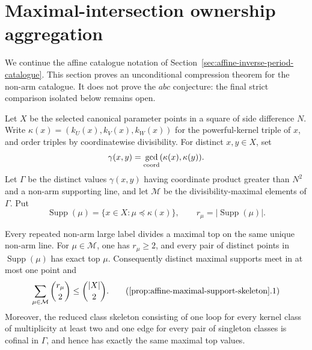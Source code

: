 \section{Maximal-intersection ownership aggregation}
\label{sec:affine-ownership-maximal-intersection}

We continue the affine catalogue notation of
Section~\ref{sec:affine-inverse-period-catalogue}.  This section proves an
unconditional compression theorem for the non-arm catalogue.  It does not
prove the \(abc\) conjecture: the final strict comparison isolated below
remains open.

Let \(X\) be the selected canonical parameter points in a square of side
difference \(N\).  Write \(\kappa(x)=(k_U(x),k_V(x),k_W(x))\) for the
powerful-kernel triple of \(x\), and order triples by coordinatewise
divisibility.  For distinct \(x,y\in X\), set
\[
 \gamma(x,y)=\gcd_{\rm coord}(\kappa(x),\kappa(y)).
\]
Let \(\Gamma\) be the distinct values \(\gamma(x,y)\) having coordinate
product greater than \(N^2\) and a non-arm supporting line, and let
\(\mathcal M\) be the divisibility-maximal elements of \(\Gamma\).  Put
\[
 \operatorname{Supp}(\mu)=\{x\in X:\mu\preceq\kappa(x)\},\qquad
 r_\mu=|\operatorname{Supp}(\mu)|.
\]

\begin{proposition}
\label{prop:affine-maximal-support-skeleton}
Every repeated non-arm large label divides a maximal top on the same unique
non-arm line.  For \(\mu\in\mathcal M\), one has \(r_\mu\ge2\), and every
pair of distinct points in \(\operatorname{Supp}(\mu)\) has exact top
\(\mu\).  Consequently distinct maximal supports meet in at most one point
and
\[
 \sum_{\mu\in\mathcal M}\binom{r_\mu}{2}\le\binom{|X|}{2}.
 \tag{\ref{prop:affine-maximal-support-skeleton}.1}
\]
Moreover, the reduced class skeleton consisting of one loop for every
kernel class of multiplicity at least two and one edge for every pair of
singleton classes is cofinal in \(\Gamma\), and hence has exactly the same
maximal top values.
\end{proposition}

